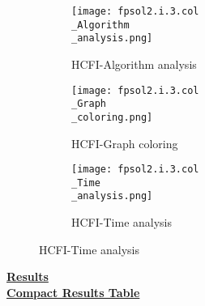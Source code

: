 \documentclass[10pt]{article}
\begin{document}
\graphicspath{{./Core1/Solutions/HCFI/fpsol2.i.3.col}}
\begin{figure}[H]
\begin{subfigure}{.33\textwidth}
  \centering
  \texttt{[image: fpsol2.i.3.col\\\_Algorithm\\\_analysis.png]}
  \caption{HCFI-Algorithm analysis}
   \label{fig:subfig1}
\end{subfigure}%
\begin{subfigure}{.33\textwidth}
  \centering
  \texttt{[image: fpsol2.i.3.col\\\_Graph\\\_coloring.png]}
  \caption{HCFI-Graph coloring}
  \label{fig:subfig2}
\end{subfigure}
\begin{subfigure}{.33\textwidth}
  \centering
  \texttt{[image: fpsol2.i.3.col\\\_Time\\\_analysis.png]}
  \caption{HCFI-Time analysis}
  \end{subfigure}
\end{figure}
\vspace{2cm}
\begin{center}
\hyperlink{page.8}{\textbf{Results}}\\
\vspace{0.5cm}
\hyperlink{page.71}{\textbf{Compact Results Table}}
\end{center}
\pagebreak
\end{document}
